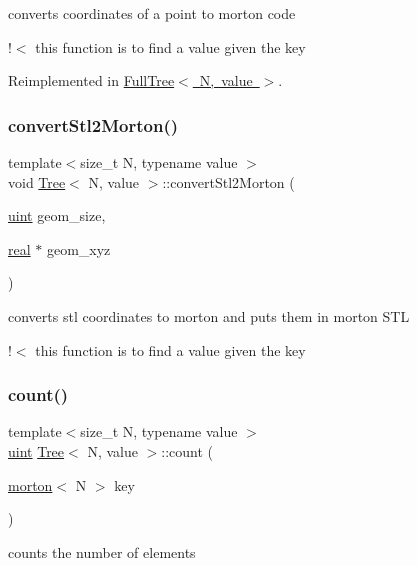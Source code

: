 converts coordinates of a point to morton code

!$<$ this function is to find a value given the key 

Reimplemented in \mbox{\hyperlink{classFullTree_a1b0a9b6f0f5155dd8847905ee8aa1b56}{Full\+Tree$<$ N, value $>$}}.

\mbox{\label{classTree_a799cfd84de5609b6a89284f116f03cfd}} 
\subsubsection{\texorpdfstring{convert\+Stl2\+Morton()}{convertStl2Morton()}}
{\footnotesize\ttfamily template$<$size\+\_\+t N, typename value $>$ \\
void \mbox{\hyperlink{classTree}{Tree}}$<$ N, value $>$\+::convert\+Stl2\+Morton (\begin{DoxyParamCaption}\item[{\mbox{\hyperlink{definitions_8h_a69aa29b598b851b0640aa225a9e5d61d}{uint}}}]{geom\+\_\+size,  }\item[{\mbox{\hyperlink{definitions_8h_aedc0ad84d1e764530814f57ad931d02a}{real}} $\ast$}]{geom\+\_\+xyz }\end{DoxyParamCaption})}

converts stl coordinates to morton and puts them in morton S\+TL

!$<$ this function is to find a value given the key \mbox{\label{classTree_a5304383e6a6fea724e6ad4c8f5c4b754}} 
\subsubsection{\texorpdfstring{count()}{count()}}
{\footnotesize\ttfamily template$<$size\+\_\+t N, typename value $>$ \\
\mbox{\hyperlink{definitions_8h_a69aa29b598b851b0640aa225a9e5d61d}{uint}} \mbox{\hyperlink{classTree}{Tree}}$<$ N, value $>$\+::count (\begin{DoxyParamCaption}\item[{\mbox{\hyperlink{definitions_8h_af8682350bd8bb38ee9023f7a0a310add}{morton}}$<$ N $>$}]{key }\end{DoxyParamCaption})}

counts the number of elements \mbox{\label{classTree_aba8489b0b3498e5995e1ab0fc6a7fbab}} 
